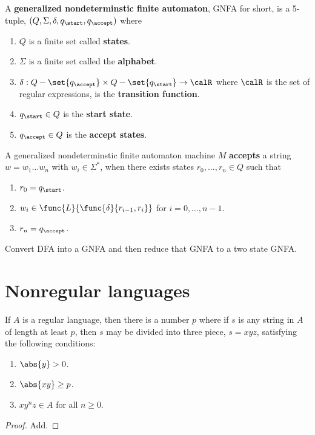 \begin{definition}
    A \textbf{generalized nondeterminstic finite automaton}, GNFA for short, is a 5-tuple, \((Q,\Sigma, \delta, q_{\start}, q_{\accept})\) where
    \begin{enumerate}
        \item \(Q\) is a finite set called \textbf{states}.
        \item \(\Sigma\) is a finite set called the \textbf{alphabet}.
        \item \(\delta: Q - \set{q_{\accept}}\times  Q - \set{q_{\start}} \to \calR\) where \(\calR\) is the set of regular expressions, is the \textbf{transition function}.
        \item \(q_{\start} \in Q\) is the \textbf{start state}.
        \item \(q_{\accept} \in Q\) is the \textbf{accept states}.
    \end{enumerate}
\end{definition}
A generalized nondeterminstic finite automaton machine \(M\) \textbf{accepts} a string \(w = w_1\dots w_n\) with \(w_i \in \Sigma^{\ast}\), when there exists states \(r_0 , \dots , r_n \in Q\) such that 
\begin{enumerate}
    \item \(r_0 = q_{\start}\).
    \item \(w_{i} \in \func{L}{\func{\delta}{r_{i-1}, r_{i}}}\) for \(i = 0, \dots, n-1\).
    \item \(r_n = q_{\accept}\).
\end{enumerate}

\begin{prooflemma}
    Convert DFA into a GNFA and then reduce that GNFA to a two state GNFA.
\end{prooflemma}

\section{Nonregular languages}
\begin{theorem}
    If \(A\) is a regular language, then there is a number \(p\) where if \(s\) is any string in \(A\) of length at least \(p\), then \(s\) may be divided into three piece, \(s = xyz\), satisfying the following conditions:
    \begin{enumerate}
        \item \(\abs{y} > 0\).
        \item \(\abs{xy} \geq p\).
        \item \(xy^nz \in A\) for all \(n \geq 0\).
    \end{enumerate}
\end{theorem}

\begin{proof}
    Add.
\end{proof}
